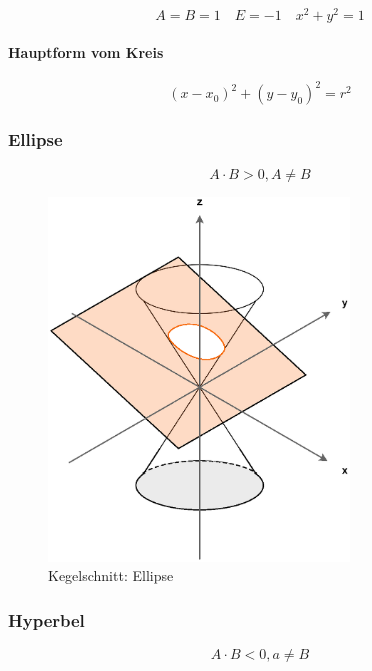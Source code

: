 \[
	A = B = 1 \quad E = -1 \quad x^2 + y^2 = 1
\]

\paragraph{Hauptform vom Kreis}

\[
	{(x - x_0)}^2 + {(y - y_0)}^2 = r^2
\]


\subsubsection{Ellipse}

\[
	A \cdot B > 0, A \neq B
\]

\begin{figure}[H]
	\centering
	\includegraphics[width=8cm]{grafiken/kegelschnitte/ellipse}
	\caption{Kegelschnitt: Ellipse}
\end{figure}


\subsubsection{Hyperbel}

\[
	A \cdot B < 0, a \neq B
\]

